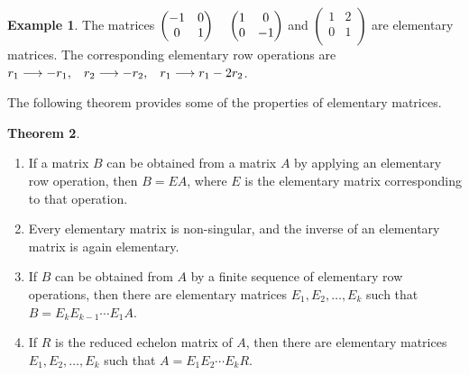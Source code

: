 \documentclass[11pt,a4paper]{article}
\theoremstyle{definition}
\newtheorem{thm}{Theorem}[subsection]
\newtheorem{exa}[thm]{Example}
\begin{document}
\begin{exa}
The matrices 
$
\begin{pmatrix}
-1&0\\0&1\\
\end{pmatrix}
\hspace{0.4cm}
\begin{pmatrix}
1&0\\0&-1\\
\end{pmatrix}
$ and $
\begin{pmatrix}
1&2\\0&1\\
\end{pmatrix}
$ are elementary matrices. The corresponding elementary row operations are $r_1\longrightarrow -r_1,\hspace{0.3cm} r_2\longrightarrow -r_2,\hspace{0.3cm}r_1\longrightarrow r_1-2r_2$.
\end{exa}
The following theorem provides some of the properties of elementary matrices.


\begin{thm}\label{thm:elementary-matrices}
\begin{enumerate}
\item If a matrix $B$ can be obtained from a matrix $A$ by applying an
elementary row operation, then $B=EA$, where $E$ is the elementary matrix
corresponding to that operation.
\item Every elementary matrix is non-singular, and the inverse of an elementary
matrix is again elementary.
\item If $B$ can be obtained from $A$ by a finite sequence of elementary row
operations, then there are elementary matrices $E_1,E_2,\dots,E_k$ such that
$B=E_kE_{k-1}\cdots E_1A$.
\item If $R$ is the reduced echelon matrix of $A$, then there are elementary
matrices $E_1,E_2,\dots,E_k$ such that $A=E_1E_2\cdots E_kR$.
\end{enumerate}
\end{thm}
\end{document}
